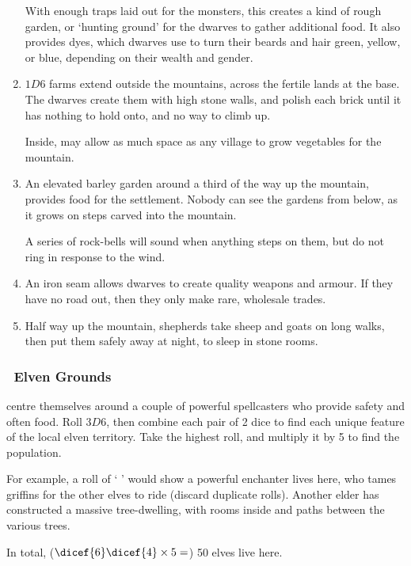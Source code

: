 \begin{multicols}{2}
\begin{enumerate}
  With enough traps laid out for the monsters, this creates a kind of rough garden, or `hunting ground' for the dwarves to gather additional food.
  It also provides dyes, which dwarves use to turn their beards and hair green, yellow, or blue, depending on their wealth and gender.\index[Dye]
  \item
  $1D6$ farms extend outside the mountains, across the fertile lands at the base.
  The dwarves create them with high stone walls, and polish each brick until it has nothing to hold onto, and no way to climb up.

  Inside, may allow as much space as any \gls{village} to grow vegetables for the mountain.
  \item
  An elevated barley garden around a third of the way up the mountain, provides food for the settlement.
  Nobody can see the gardens from below, as it grows on steps carved into the mountain.

  A series of rock-bells will sound when anything steps on them, but do not ring in response to the wind.
  \item
  An iron seam allows dwarves to create quality weapons and armour.
  If they have no road out, then they only make rare, wholesale trades.
  \item
  Half way up the mountain, shepherds take sheep and goats on long walks, then put them safely away at night, to sleep in stone rooms.
\end{enumerate}

\subsubsection[Elven Grounds]{\El\ Elven Grounds}
\label{elvesPoint}
centre themselves around a couple of powerful spellcasters who provide safety and often food.
Roll $3D6$, then combine each pair of 2 dice to find each unique feature of the local elven territory.
Take the highest roll, and multiply it by 5 to find the population.

\begin{exampletext}
  For example, a roll of `  ' would show a powerful enchanter lives here, who tames griffins for the other elves to ride
  (discard duplicate rolls).
  Another elder has constructed a massive tree-dwelling, with rooms inside and paths between the various trees.

  In total, ($\dicef{6}\dicef{4}\times 5 =$) 50 elves live here.



\end{exampletext}
\end{multicols}
